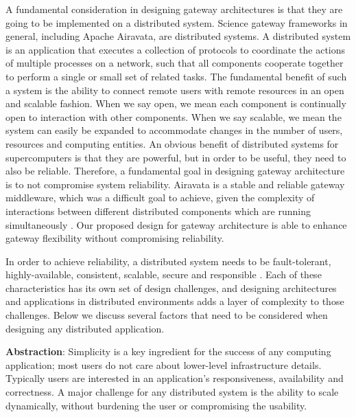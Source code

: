 \documentclass[sigconf]{acmart}
\begin{document}
A fundamental consideration in designing gateway architectures is that they are going to be implemented on a distributed system.  Science gateway frameworks in general, including Apache Airavata, are distributed systems.  A distributed system is an application that executes a collection of protocols to coordinate the actions of multiple processes on a network, such that all components cooperate together to perform a single or small set of related tasks. The fundamental benefit of such a system is the ability to connect remote users with remote resources in an open and scalable fashion. When we say open, we mean each component is continually open to interaction with other components. When we say scalable, we mean the system can easily be expanded to accommodate changes in the number of users, resources and computing entities. An obvious benefit of distributed systems for supercomputers is that they are powerful, but in order to be useful, they need to also be reliable.  Therefore, a fundamental goal in designing gateway architecture is to not compromise system reliability.  Airavata is a stable and reliable gateway middleware, which was a difficult goal to achieve, given the complexity of interactions between different distributed components which are running simultaneously \cite{pierce2015apache}. Our proposed design for gateway architecture is able to enhance gateway flexibility without compromising reliability.

In order to achieve reliability, a distributed system needs to be fault-tolerant, highly-available, consistent, scalable, secure and responsible \cite{burns2016design, casavant1988taxonomy}. Each of these characteristics has its own set of design challenges, and designing architectures and applications in distributed environments adds a layer of complexity to those challenges.  Below we discuss several factors that need to be considered when designing any distributed application. \newline
  
\textbf{Abstraction}: Simplicity is a key ingredient for the success of any computing application; most users do not care about lower-level infrastructure details. Typically users are interested in an application's responsiveness, availability and correctness. A major challenge for any distributed system is the ability to scale dynamically, without burdening the user or compromising the usability. \newline
\end{document}
